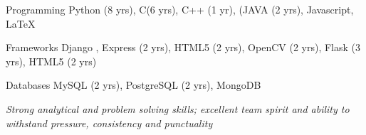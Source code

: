 


\begin{cvcompetencies}


\cvcompetency
{Programming} %
{Python (8 yrs), C(6 yrs), C++ (1 yr), (JAVA (2 yrs), 
Javascript, LaTeX} %


\cvcompetency
{Frameworks} %
{Django , Express (2 yrs),
HTML5 (2 yrs), OpenCV (2 yrs), Flask (3 yrs), HTML5 (2 yrs)} %


\cvcompetency
{Databases} %
{MySQL (2 yrs), PostgreSQL (2 yrs), MongoDB  } %

\end{cvcompetencies}
\textit{Strong analytical and problem solving skills; excellent team spirit and ability to withstand pressure, consistency and punctuality}